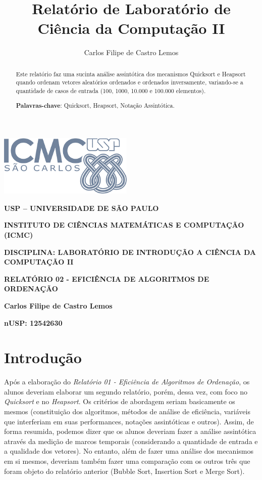 \documentclass[a4paper, 12pt]{article}
\title{Relatório de Laboratório de Ciência da Computação II}
\author{Carlos Filipe de Castro Lemos}
\begin{document}

\begin{center}
    \includegraphics[width=2.52778in,height=1.14532in]{logotipoICMC.png}

        \textbf{USP -- UNIVERSIDADE DE SÃO PAULO}

        \textbf{INSTITUTO DE CIÊNCIAS MATEMÁTICAS E COMPUTAÇÃO (ICMC)}

        \textbf{DISCIPLINA: LABORATÓRIO DE INTRODUÇÃO A CIÊNCIA DA COMPUTAÇÃO II}

    \vspace{0.9cm}

        \textbf{RELATÓRIO 02 - EFICIÊNCIA DE ALGORITMOS DE ORDENAÇÃO}

        \textbf{Carlos Filipe de Castro Lemos}

        \textbf{nUSP: 12542630}
    \end{center}

\vspace{0.2cm}
\begin{abstract}
   \noindent
   Este relatório faz uma sucinta análise assintótica dos mecanismos Quicksort e Heapsort quando ordenam vetores aleatórios ordenados e ordenados inversamente, variando-se a quantidade de casos de entrada (100, 1000, 10.000 e 100.000 elementos).

   \noindent
   \textbf{Palavras-chave}: Quicksort, Heapsort, Notação Assintótica.
\end{abstract}



\section{Introdução}

\tab{ }Após a elaboração do \textit{Relatório 01 - Eficiência de Algoritmos de Ordenação}, os alunos deveriam elaborar um segundo relatório, porém, dessa vez, com foco no \textit{Quicksort} e no \textit{Heapsort}. Os critérios de abordagem seriam basicamente os mesmos (constituição dos algoritmos, métodos de análise de eficiência, variáveis que interferiam em suas performances, notações assintóticas e outros). Assim, de forma resumida, podemos dizer que os alunos deveriam fazer a análise assintótica através da medição de marcos temporais (considerando a quantidade de entrada e a qualidade dos vetores). No entanto, além de fazer uma análise dos mecanismos em si mesmos, deveriam também fazer uma comparação com os outros três que foram objeto do relatório anterior (Bubble Sort, Insertion Sort e Merge Sort).
\end{document}

